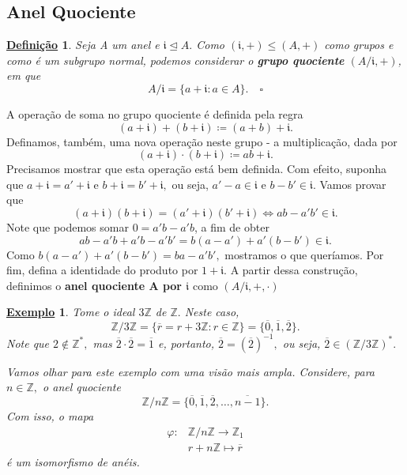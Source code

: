 \documentclass{article}
\newtheorem*{def*}{\underline{Defini\c c\~ao}}
\newtheorem{example}{\underline{Exemplo}}
\begin{document}
\subsection{Anel Quociente}
\begin{def*}
  Seja A um anel e \(\mathfrak{i}\trianglelefteq{A}.\) Como \((\mathfrak{i}, +)\leq (A, +)\) como grupos e
  como é um subgrupo normal, podemos considerar o \textbf{grupo quociente} \((A/\mathfrak{i}, +)\), em que 
  \[
    A/\mathfrak{i} = \{a + \mathfrak{i}: a \in A\}.\quad\square
  \]
\end{def*}
A operação de soma no grupo quociente é definida pela regra 
\[
  (a+\mathfrak{i})+(b+\mathfrak{i})\coloneqq (a+b)+\mathfrak{i}.
\]
Definamos, também, uma nova operação neste grupo - a multiplicação, dada por 
\[
  (a+\mathfrak{i})\cdot (b+\mathfrak{i})\coloneqq ab + \mathfrak{i}. 
\]
Precisamos mostrar que esta operação está bem definida. Com efeito, suponha que
\(a+\mathfrak{i} = a'+\mathfrak{i}\) e \(b+\mathfrak{i} = b'+\mathfrak{i},\) ou seja,
\(a'-a\in \mathfrak{i}\) e \(b-b'\in \mathfrak{i}.\) Vamos provar que 
\[
  (a+\mathfrak{i})(b+\mathfrak{i}) = (a'+\mathfrak{i})(b'+\mathfrak{i}) \Longleftrightarrow ab - a'b'\in \mathfrak{i}.
\]
Note que podemos somar \(0=a'b-a'b\), a fim de obter 
\[
  ab - a'b + a'b - a'b' = b(a-a') + a'(b-b')\in \mathfrak{i}.
\] 
Como \(b(a-a') + a'(b-b') = ba - a'b',\) mostramos o que queríamos. Por fim,
defina a identidade do produto por \(1 + \mathfrak{i}.\) A partir dessa construção,
definimos o \textbf{anel quociente A por \(\mathfrak{i}\)} como \((A/\mathfrak{i}, +, \cdot )\)
\begin{example}
  Tome o ideal \(3 \mathbb{Z}\) de \(\mathbb{Z}.\) Neste caso, 
  \[
    \mathbb{Z}/3 \mathbb{Z} = \{\overline{r} = r + 3 \mathbb{Z}:r\in \mathbb{Z}\} = \{\overline{0}, \overline{1}, \overline{2}\}.
  \]
  Note que \(2\not\in \mathbb{Z}^{*},\) mas \(\overline{2}\cdot \overline{2} = \overline{1}\) e, portanto, \(\overline{2} = (\overline{2})^{-1},\) ou seja,
  \(\overline{2}\in (\mathbb{Z}/3 \mathbb{Z})^{*}.\)

  Vamos olhar para este exemplo com uma visão mais ampla. Considere, para \(n\in \mathbb{Z},\) o anel quociente 
  \[
    \mathbb{Z}/n \mathbb{Z} = \{\overline{0}, \overline{1}, \overline{2}, \dotsc , \overline{n-1}\}.
  \]
  Com isso, o mapa 
  \begin{align*}
    \varphi : &\mathbb{Z}/n \mathbb{Z}\rightarrow \mathbb{Z}_{1}\\
              &r + n\mathbb{Z}\mapsto \overline{r}
  \end{align*}
  é um isomorfismo de anéis.
\end{example}
\end{document}

